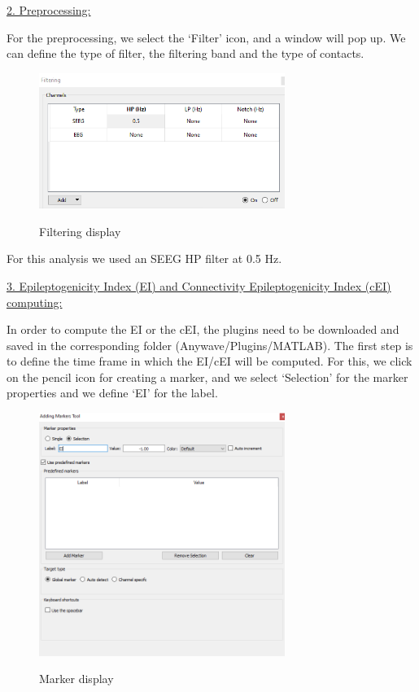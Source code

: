 \documentclass[11pt,oneside]{amsart}
\begin{document}
\underline{2. Preprocessing:}

For the preprocessing, we select the ‘Filter’ icon, and a window will pop up. We can define the type of filter, the filtering band and the type of contacts. 

\begin{figure}[H] \hspace{-0cm} \centering \hspace{0cm} \includegraphics[width=8cm,angle=0]{figures/filter.png} \label{fig:2}
    \caption{Filtering display} 
\end{figure}

For this analysis we used an SEEG HP filter at 0.5 Hz.

\underline{3. Epileptogenicity Index (EI) and Connectivity Epileptogenicity Index (cEI) computing:} 

In order to compute the EI or the cEI, the plugins need to be downloaded and saved in the corresponding folder (Anywave/Plugins/MATLAB). 
The first step is to define the time frame in which the EI/cEI will be computed. For this, we click on the pencil icon for creating a marker, and we select ‘Selection’ for the marker properties and we define ‘EI’ for the label.

\begin{figure}[H] \hspace{-0cm} \centering \hspace{0cm} \includegraphics[width=8cm,angle=0]{figures/marker_tool.png} \label{fig:3}
    \caption{Marker display} 
\end{figure}
\end{document}
